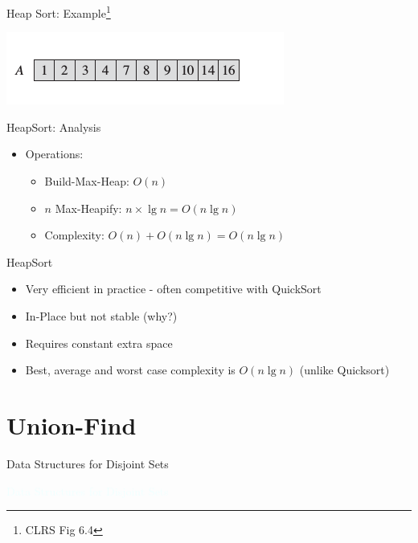 \documentclass{beamer}
\newcommand{\thblue}[1]{{\Huge {\textcolor{azure}{#1}}}}
\begin{document}
\begin{frame}{Heap Sort: Example\footnote{CLRS Fig 6.4}}
    \begin{center}
        \includegraphics[scale=0.7]{heapSort11.png}
    \end{center}
\end{frame}


\begin{frame}{HeapSort: Analysis}
    \begin{itemize}
        \item Operations: 
        \begin{itemize}
            \item Build-Max-Heap: \pause $O(n)$
            \item $n$ Max-Heapify: \pause $n \times \lg n = O(n \lg n)$
            \item Complexity: $O(n) + O(n \lg n) = O(n \lg n)$
        \end{itemize}
    \end{itemize}
\end{frame}

\begin{frame}{HeapSort}
    \begin{itemize}
        \item Very efficient in practice - often competitive with QuickSort
        \item In-Place but not stable (why?)
        \item Requires constant extra space
        \item Best, average and worst case complexity is $O(n \lg n)$ (unlike Quicksort)
    \end{itemize}
\end{frame}

\section{Union-Find}

\begin{frame}{Data Structures for Disjoint Sets}
    \begin{center}
        \thblue{Data Structures for Disjoint Sets}
    \end{center}
\end{frame}
\end{document}
